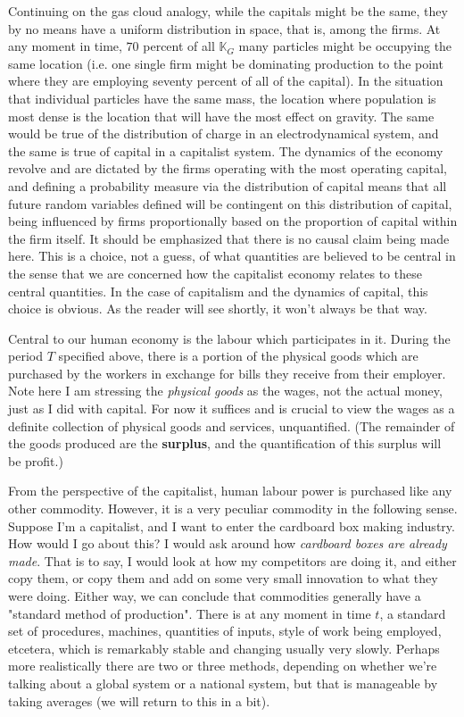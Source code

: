 Continuing on the gas cloud analogy, while the capitals might be the same, they by no means have a uniform distribution in space, that is, among the firms. At any moment in time, $70$ percent of all $\mathbb{K}_G$ many particles might be occupying the same location (i.e. one single firm might be dominating production to the point where they are employing seventy percent of all of the capital). In the situation that individual particles have the same mass, the location where population is most dense is the location that will have the most effect on gravity. The same would be true of the distribution of charge in an electrodynamical system, and the same is true of capital in a capitalist system. The dynamics of the economy revolve and are dictated by the firms operating with the most operating capital, and defining a probability measure via the distribution of capital means that all future random variables defined will be contingent on this distribution of capital, being influenced by firms proportionally based on the proportion of capital within the firm itself. It should be emphasized that there is no causal claim being made here. This is a choice, not a guess, of what quantities are believed to be central in the sense that we are concerned how the capitalist economy relates to these central quantities. In the case of capitalism and the dynamics of capital, this choice is obvious. As the reader will see shortly, it won't always be that way.
 \par 
Central to our human economy is the labour which participates in it. During the period $T$ specified above, there is a portion of the physical goods which are purchased by the workers in exchange for bills they receive from their employer. Note here I am stressing the \textit{physical goods} as the wages, not the actual money, just as I did with capital. For now it suffices and is crucial to view the wages as a definite collection of physical goods and services, unquantified. (The remainder of the goods produced are the \textbf{surplus}, and the quantification of this surplus will be profit.) \par 
From the perspective of the capitalist, human labour power is purchased like any other commodity. However, it is a very peculiar commodity in the following sense. Suppose I'm a capitalist, and I want to enter the cardboard box making industry. How would I go about this? I would ask around how \textit{cardboard boxes are already made}. That is to say, I would look at how my competitors are doing it, and either copy them, or copy them and add on some very small innovation to what they were doing. Either way, we can conclude that commodities generally have a "standard method of production". There is at any moment in time $t$, a standard set of procedures, machines, quantities of inputs, style of work being employed, etcetera, which is remarkably stable and changing usually very slowly. Perhaps more realistically there are two or three methods, depending on whether we're talking about a global system or a national system, but that is manageable by taking averages (we will return to this in a bit). \par 

